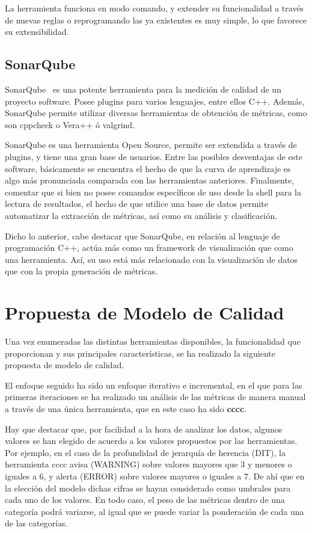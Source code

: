 \documentclass[11pt]{article}
\begin{document}
La herramienta funciona en modo comando, y extender su funcionalidad a través de nuevas reglas o reprogramando las ya existentes es muy simple, lo que favorece su extensibilidad.

\subsection{SonarQube}

SonarQube~\cite{metrictools:sonarqube} es una potente herramienta para la medición de calidad de un proyecto software. Posee plugins para varios lenguajes, entre ellos C++. Además, SonarQube permite utilizar diversas herramientas de obtención de métricas, como son cppcheck o Vera++ ó valgrind.

SonarQube es una herramienta Open Source, permite ser extendida a través de plugins, y tiene una gran base de usuarios. Entre las posibles desventajas de este software, básicamente se encuentra el hecho de que la curva de aprendizaje es algo más pronunciada comparada con las herramientas anteriores. Finalmente, comentar que si bien no posee comandos específicos de uso desde la shell para la lectura de resultados, el hecho de que utilice una base de datos permite automatizar la extracción de métricas, así como su análisis y clasificación.

Dicho lo anterior, cabe destacar que SonarQube, en relación al lenguaje de programación C++, actúa más como un framework de visualización que como una herramienta. Así, su uso está más relacionado con la visualización de datos que con la propia generación de métricas.

\section{Propuesta de Modelo de Calidad}

Una vez enumeradas las distintas herramientas disponibles, la funcionalidad que proporcionan y sus principales características, se ha realizado la siguiente propuesta de modelo de calidad. 

El enfoque seguido ha sido un enfoque iterativo e incremental, en el que para las primeras iteraciones se ha realizado un análisis de las métricas de manera manual a través de una única herramienta, que en este caso ha sido \textbf{cccc}.

Hay que destacar que, por facilidad a la hora de analizar los datos, algunos valores se han elegido de acuerdo a los valores propuestos por las herramientas. Por ejemplo, en el caso de la profundidad de jerarquía de herencia (DIT), la herramienta cccc avisa (WARNING) sobre valores mayores que 3 y menores o iguales a 6, y alerta (ERROR) sobre valores mayores o iguales a 7. De ahí que en la elección del modelo dichas cifras se hayan considerado como umbrales para cada uno de los valores. En todo caso, el peso de las métricas dentro de una categoría podrá variarse, al igual que se puede variar la ponderación de cada una de las categorías.
\end{document}
